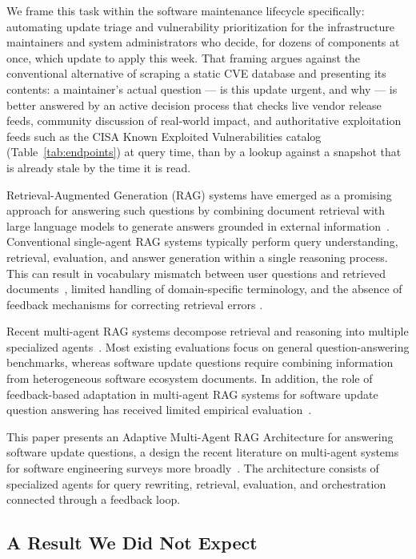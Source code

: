 \documentclass[acmsmall,review,anonymous,screen]{acmart}
\begin{document}
We frame this task within the software maintenance lifecycle specifically:
automating update triage and vulnerability prioritization for the
infrastructure maintainers and system administrators who decide, for dozens
of components at once, which update to apply this week. That framing argues
against the conventional alternative of scraping a static CVE database and
presenting its contents: a maintainer's actual question --- is this update
urgent, and why --- is better answered by an active decision process that
checks live vendor release feeds, community discussion of real-world impact,
and authoritative exploitation feeds such as the CISA Known Exploited
Vulnerabilities catalog (Table~\ref{tab:endpoints}) at query time, than by a
lookup against a snapshot that is already stale by the time it is read.

Retrieval-Augmented Generation (RAG) systems have emerged as a promising approach for answering such questions by combining document retrieval with large language models to generate answers grounded in external information~\cite{lewis2020rag}. Conventional single-agent RAG systems typically perform query understanding, retrieval, evaluation, and answer generation within a single reasoning process. This can result in vocabulary mismatch between user questions and retrieved documents~\cite{gao2024dmqr}, limited handling of domain-specific terminology, and the absence of feedback mechanisms for correcting retrieval errors \cite{cook2025rag}.

Recent multi-agent RAG systems decompose retrieval and reasoning into multiple specialized agents~\cite{wang2024mainrag, nguyen2025marag}. Most existing evaluations focus on general question-answering benchmarks, whereas software update questions require combining information from heterogeneous software ecosystem documents. In addition, the role of feedback-based adaptation in multi-agent RAG systems for software update question answering has received limited empirical evaluation~\cite{ma2023rafe}.

This paper presents an Adaptive Multi-Agent RAG Architecture for answering
software update questions, a design the recent literature on multi-agent systems
for software engineering surveys more broadly~\cite{he2025}. The architecture
consists of specialized agents for query rewriting, retrieval, evaluation, and
orchestration connected through a feedback loop.

\subsection{A Result We Did Not Expect}
\end{document}
